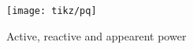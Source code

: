 \begin{figure}
	\centering
	\texttt{[image: tikz/pq]}
	\caption[Active, reactive and appearent power]{Active, reactive and appearent power}
	\label{fig:pq}
\end{figure}
